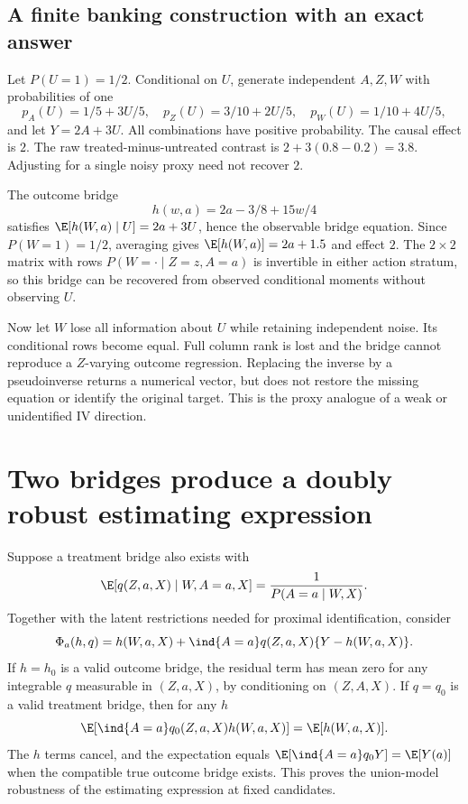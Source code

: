 \subsection{A finite banking construction with an exact answer}
Let $P(U=1)=1/2$. Conditional on $U$, generate independent $A,Z,W$
with probabilities of one
\[
 p_A(U)=1/5+3U/5,\quad
 p_Z(U)=3/10+2U/5,\quad
 p_W(U)=1/10+4U/5,
\]
and let $Y=2A+3U$. All combinations have positive probability.
The causal effect is $2$. The raw treated-minus-untreated contrast
is $2+3(0.8-0.2)=3.8$. Adjusting for a single noisy proxy need not
recover $2$.

The outcome bridge
\begin{equation}
 h(w,a)=2a-3/8+15w/4
 \label{r3:proxy-example-bridge}
\end{equation}
satisfies $\E[h(W,a)\mid U]=2a+3U$, hence the observable
bridge equation. Since $P(W=1)=1/2$, averaging gives
$\E[h(W,a)]=2a+1.5$ and effect $2$.
The $2\times2$ matrix with rows $P(W=\cdot\mid Z=z,A=a)$
is invertible in either action stratum, so this bridge can be recovered
from observed conditional moments without observing $U$.

Now let $W$ lose all information about $U$ while retaining independent
noise. Its conditional rows become equal. Full column rank is lost and the
bridge cannot reproduce a $Z$-varying outcome regression. Replacing
the inverse by a pseudoinverse returns a numerical vector, but does not
restore the missing equation or identify the original target. This is
the proxy analogue of a weak or unidentified IV direction.

\section{Two bridges produce a doubly robust estimating expression}
\label{r3:proximal-score}
Suppose a treatment bridge also exists with
\begin{equation}
 \E[q(Z,a,X)\mid W,A=a,X]
       =\frac1{P(A=a\mid W,X)}.
 \label{r3:treatment-bridge}
\end{equation}
Together with the latent restrictions needed for proximal identification,
consider
\begin{equation}
 \Phi_a(h,q)=h(W,a,X)+\ind\{A=a\}q(Z,a,X)
                                  \{Y-h(W,a,X)\}.
 \label{r3:proximal-augmented}
\end{equation}
If $h=h_0$ is a valid outcome bridge, the residual term has mean zero
for any integrable $q$ measurable in $(Z,a,X)$, by conditioning on
$(Z,A,X)$. If $q=q_0$ is a valid treatment bridge, then for any $h$
\[
 \E[\ind\{A=a\}q_0(Z,a,X)h(W,a,X)]=\E[h(W,a,X)].
\]
The $h$ terms cancel, and the expectation equals
$\E[\ind\{A=a\}q_0Y]=\E[Y(a)]$ when the compatible true
outcome bridge exists. This proves the union-model robustness of
the estimating expression at fixed candidates.


